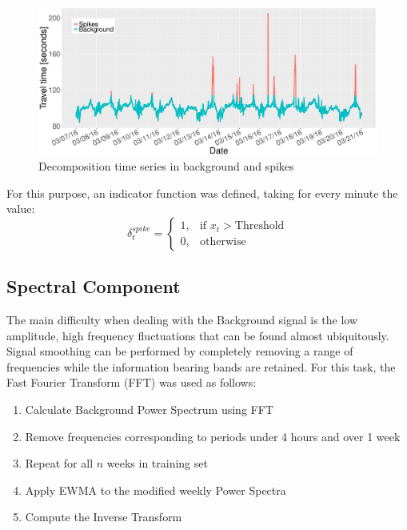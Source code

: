 \documentclass[conference, letterpaper]{IEEEtran}
\begin{document}
\begin{figure}[htbp]
	\centering
	\includegraphics[width=\linewidth]{BS.pdf}
	\caption{ Decomposition time series in background and spikes }
	\label{fig:Background}
\end{figure}

For this purpose, an indicator function was defined, taking for every minute the value:
\begin{equation}
    \delta_t^{spike}=
    \begin{cases}
      1, & \text{if } x_t > \text{Threshold}\\
      0, & \text{otherwise}
    \end{cases}
    \label{delta}
  \end{equation}

\subsection{Spectral Component}
The main difficulty when dealing with the Background signal is the low amplitude, high frequency fluctuations that can be found almost ubiquitously. 
Signal smoothing can be performed by completely removing a range of frequencies while the information bearing bands are retained. For this task, the Fast Fourier Transform (FFT) \cite{FFT} was used as follows:
\begin{enumerate}

	\item Calculate Background Power Spectrum using FFT
	\item Remove frequencies corresponding to periods under 4 hours and over 1 week
	\item Repeat for all $n$ weeks in training set
    \item Apply EWMA to the modified weekly Power Spectra
	\item Compute the Inverse Transform

\end{enumerate}
\end{document}
